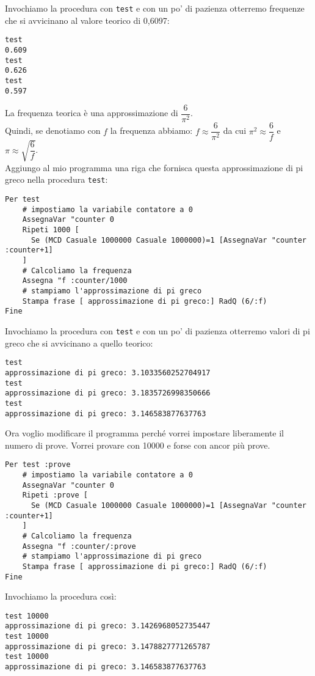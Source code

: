 Invochiamo la procedura con \texttt{test} e con un po' di pazienza otterremo frequenze che si avvicinano al valore teorico di 0,6097:\\
\begin{verbatim}
test
0.609
test
0.626
test
0.597
\end{verbatim}

La frequenza teorica è una approssimazione di $\dfrac{6}{\pi^2}$.\\

Quindi, se denotiamo con $f$ la frequenza abbiamo: $f\approx \dfrac{6}{\pi^2}$ da cui $\pi^2\approx\dfrac{6}{f}$ e $\pi\approx\sqrt{\dfrac{6}{f}}$.\\

Aggiungo al mio programma una riga che fornisca questa approssimazione di pi greco nella procedura \texttt{test}:
\begin{lstlisting}
Per test
	# impostiamo la variabile contatore a 0
	AssegnaVar "counter 0
	Ripeti 1000 [ 
	  Se (MCD Casuale 1000000 Casuale 1000000)=1 [AssegnaVar "counter :counter+1]
	]
	# Calcoliamo la frequenza
	Assegna "f :counter/1000
	# stampiamo l'approssimazione di pi greco
	Stampa frase [ approssimazione di pi greco:] RadQ (6/:f)
Fine
\end{lstlisting}
Invochiamo la procedura con \texttt{test} e con un po' di pazienza otterremo valori di pi greco che si avvicinano a quello teorico:

\begin{verbatim}
test
approssimazione di pi greco: 3.1033560252704917 
test
approssimazione di pi greco: 3.1835726998350666 
test
approssimazione di pi greco: 3.146583877637763 
\end{verbatim}

Ora voglio modificare il programma perché vorrei impostare liberamente il numero di prove. Vorrei provare con 10000 e forse con ancor più prove.
\begin{lstlisting}
Per test :prove
	# impostiamo la variabile contatore a 0
	AssegnaVar "counter 0
	Ripeti :prove [ 
	  Se (MCD Casuale 1000000 Casuale 1000000)=1 [AssegnaVar "counter :counter+1]
	]
	# Calcoliamo la frequenza
	Assegna "f :counter/:prove
	# stampiamo l'approssimazione di pi greco
	Stampa frase [ approssimazione di pi greco:] RadQ (6/:f)
Fine
\end{lstlisting}

Invochiamo la procedura così:
\begin{verbatim}
test 10000
approssimazione di pi greco: 3.1426968052735447 
test 10000
approssimazione di pi greco: 3.1478827771265787 
test 10000
approssimazione di pi greco: 3.146583877637763 
\end{verbatim} 

